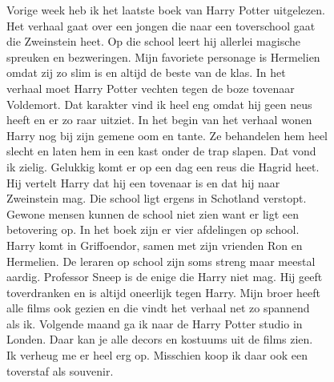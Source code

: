 \begin{opgave}

\begin{tekstmetfouten}
Vorige week heb ik het laatste boek van Harry Potter uitgelezen.\\
Het verhaal gaat over een jongen die naar een toverschool gaat\\
die Zweinstein heet. Op die school leert hij allerlei magische\\
spreuken en bezweringen. Mijn favoriete personage is Hermelien\\
omdat zij zo slim is en altijd de beste van de klas. In het\\
verhaal moet Harry Potter vechten tegen de boze tovenaar\\
Voldemort. Dat karakter vind ik heel eng omdat hij geen neus\\
heeft en er zo raar uitziet. In het begin van het verhaal wonen\\
Harry nog bij zijn gemene oom en tante. Ze behandelen hem heel\\
slecht en laten hem in een kast onder de trap slapen. Dat vond\\
ik zielig. Gelukkig komt er op een dag een reus die Hagrid heet.\\
Hij vertelt Harry dat hij een tovenaar is en dat hij naar\\
Zweinstein mag. Die school ligt ergens in Schotland verstopt.\\
Gewone mensen kunnen de school niet zien want er ligt een\\
betovering op. In het boek zijn er vier afdelingen op school.\\
Harry komt in Griffoendor, samen met zijn vrienden Ron en\\
Hermelien. De leraren op school zijn soms streng maar meestal\\
aardig. Professor Sneep is de enige die Harry niet mag. Hij geeft\\
toverdranken en is altijd oneerlijk tegen Harry. Mijn broer heeft\\
alle films ook gezien en die vindt het verhaal net zo spannend\\
als ik. Volgende maand ga ik naar de Harry Potter studio in\\
Londen. Daar kan je alle decors en kostuums uit de films zien.\\
Ik verheug me er heel erg op. Misschien koop ik daar ook een\\
toverstaf als souvenir.
\end{tekstmetfouten}


\end{opgave}
